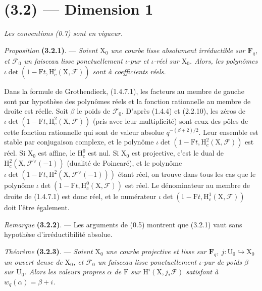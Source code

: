 \documentclass[11pt,leqno]{article}
\newcommand{\Page}[1]{\ifvmode\noindent\else\unskip\ \fi{\footnotesize\textcolor{gray}{[p.\,#1]}}\ \ignorespaces}
\begin{document}
\section*{(3.2) — Dimension 1}

\textit{Les conventions \textup{(0.7)} sont en vigueur.}

\textit{Proposition} \textbf{(3.2.1)}. — \textit{Soient \(\mathrm X_0\) une courbe lisse absolument irréductible sur \(\mathbf F_q\), et \(\mathscr F_0\) un faisceau lisse ponctuellement \(\iota\)-pur et \(\iota\)-réel sur \(\mathrm X_0\). Alors, les polynômes \(\iota\det(1-\mathrm F t,\mathrm H_c^i(\mathrm X,\mathscr F))\) sont à coefficients réels.}

Dans la formule de Grothendieck, (1.4.7.1), les facteurs au membre de gauche sont par hypothèse des polynômes réels et la fonction rationnelle au membre de droite est réelle. Soit \(\beta\) le poids de \(\mathscr F_0\). D’après (1.4.4) et (2.2.10), les zéros de \(\iota\det(1-\mathrm F t,\mathrm H_c^2(\mathrm X,\mathscr F))\) (pris avec leur multiplicité) sont ceux des pôles de cette fonction rationnelle qui sont de valeur absolue \(q^{-(\beta+2)/2}\). Leur ensemble est stable par conjugaison complexe, et le polynôme \(\iota\det(1-\mathrm F t,\mathrm H_c^2(\mathrm X,\mathscr F))\) est réel. Si \(\mathrm X_0\) est affine, le \(\mathrm H_c^0\) est nul. Si \(\mathrm X_0\) est projective, c’est le dual de \(\mathrm H_c^2(\mathrm X,\mathscr F^\vee(-1))\) (dualité de Poincaré), et le polynôme \(\iota\det(1-\mathrm F t,\mathrm H^2(\mathrm X,\mathscr F^\vee(-1)))\) étant réel, on trouve dans tous les cas que le polynôme \(\iota\det(1-\mathrm F t,\mathrm H_c^0(\mathrm X,\mathscr F))\) est réel. Le dénominateur au membre de droite de (1.4.7.1) est donc réel, et le numérateur \(\iota\det(1-\mathrm F t,\mathrm H_c^1(\mathrm X,\mathscr F))\) doit l’être également.

\textit{Remarque} \textbf{(3.2.2)}. — Les arguments de (0.5) montrent que (3.2.1) vaut sans hypothèse d’irréductibilité absolue.

\textit{Théorème} \textbf{(3.2.3)}. — \textit{Soient \(\mathrm X_0\) une courbe projective et lisse sur \(\mathbf F_q\), \(j:\mathrm U_0\hookrightarrow\mathrm X_0\) un ouvert dense de \(\mathrm X_0\), et \(\mathscr F_0\) un faisceau lisse ponctuellement \(\iota\)-pur de poids \(\beta\) sur \(\mathrm U_0\). Alors les valeurs propres \(\alpha\) de \(\mathrm F\) sur \(\mathrm H^i(\mathrm X,j_*\mathscr F)\) satisfont à \(w_q(\alpha)=\beta+i\).}

\Page{201}
\end{document}
